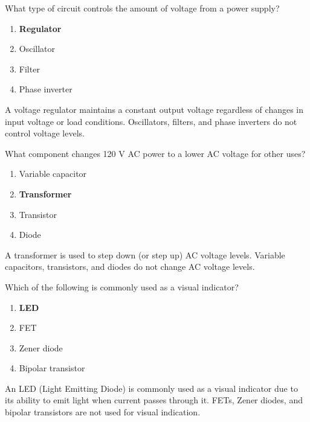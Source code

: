 
\begin{tcolorbox}[colback=gray!10!white,colframe=black!75!black,title={T6D05}]
    What type of circuit controls the amount of voltage from a power supply?
    \begin{enumerate}[label=\Alph*,noitemsep]
        \item \textbf{Regulator}
        \item Oscillator
        \item Filter
        \item Phase inverter
    \end{enumerate}
\end{tcolorbox}
A voltage regulator maintains a constant output voltage regardless of changes in input voltage or load conditions. Oscillators, filters, and phase inverters do not control voltage levels.


\begin{tcolorbox}[colback=gray!10!white,colframe=black!75!black,title={T6D06}]
    What component changes 120 V AC power to a lower AC voltage for other uses?
    \begin{enumerate}[label=\Alph*,noitemsep]
        \item Variable capacitor
        \item \textbf{Transformer}
        \item Transistor
        \item Diode
    \end{enumerate}
\end{tcolorbox}
A transformer is used to step down (or step up) AC voltage levels. Variable capacitors, transistors, and diodes do not change AC voltage levels.


\begin{tcolorbox}[colback=gray!10!white,colframe=black!75!black,title={T6D07}]
    Which of the following is commonly used as a visual indicator?
    \begin{enumerate}[label=\Alph*,noitemsep]
        \item \textbf{LED}
        \item FET
        \item Zener diode
        \item Bipolar transistor
    \end{enumerate}
\end{tcolorbox}
An LED (Light Emitting Diode) is commonly used as a visual indicator due to its ability to emit light when current passes through it. FETs, Zener diodes, and bipolar transistors are not used for visual indication.

